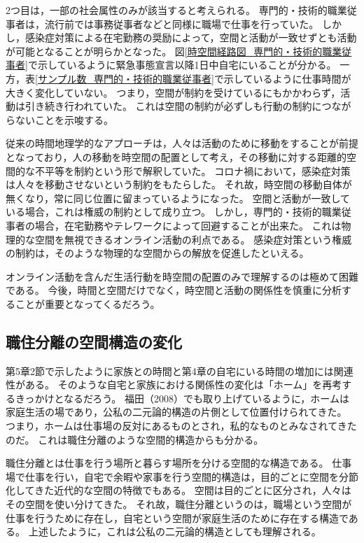 \documentclass[paper={210mm,297mm},fontsize=15Q,line_length=35zw,number_of_lines=31,head_space=30mm,gutter=40mm,baselineskip=2.0zw,headfoot_verticalposition=1.5zw]{jlreq}
\begin{document}
2つ目は，一部の社会属性のみが該当すると考えられる。
専門的・技術的職業従事者は，流行前では事務従事者などと同様に職場で仕事を行っていた。
しかし，感染症対策による在宅勤務の奨励によって，空間と活動が一致せずとも活動が可能となることが明らかとなった。
図\ref{時空間経路図_専門的・技術的職業従事者}で示しているように緊急事態宣言以降1日中自宅にいることが分かる。
一方，表\ref{サンプル数_専門的・技術的職業従事者}で示しているように仕事時間が大きく変化していない。
つまり，空間が制約を受けているにもかかわらず，活動は引き続き行われていた。
これは空間の制約が必ずしも行動の制約につながらないことを示唆する。

従来の時間地理学的なアプローチは，人々は活動のために移動をすることが前提となっており，人の移動を時空間の配置として考え，その移動に対する距離的空間的な不平等を制約という形で解釈していた。
コロナ禍において，感染症対策は人々を移動させないという制約をもたらした。
それ故，時空間の移動自体が無くなり，常に同じ位置に留まっているようになった。
空間と活動が一致している場合，これは権威の制約として成り立つ。
しかし，専門的・技術的職業従事者の場合，在宅勤務やテレワークによって回避することが出来た。
これは物理的な空間を無視できるオンライン活動の利点である。
感染症対策という権威の制約は，そのような物理的な空間からの解放を促進したといえる。

オンライン活動を含んだ生活行動を時空間の配置のみで理解するのは極めて困難である。
今後，時間と空間だけでなく，時空間と活動の関係性を慎重に分析することが重要となってくるだろう。

\subsection{職住分離の空間構造の変化}

第5章2節で示したように家族との時間と第4章の自宅にいる時間の増加には関連性がある。
そのような自宅と家族における関係性の変化は「ホーム」を再考するきっかけとなるだろう。
福田（2008）でも取り上げているように，ホームは家庭生活の場であり，公私の二元論的構造の片側として位置付けられてきた。
つまり，ホームは仕事場の反対にあるものとされ，私的なものとみなされてきたのだ。
これは職住分離のような空間的構造からも分かる。

職住分離とは仕事を行う場所と暮らす場所を分ける空間的な構造である。
仕事場で仕事を行い，自宅で余暇や家事を行う空間的構造は，目的ごとに空間を分節化してきた近代的な空間の特徴でもある。
空間は目的ごとに区分され，人々はその空間を使い分けてきた。
それ故，職住分離というのは，職場という空間が仕事を行うために存在し，自宅という空間が家庭生活のために存在する構造である。
上述したように，これは公私の二元論的構造としても理解される。
\end{document}
